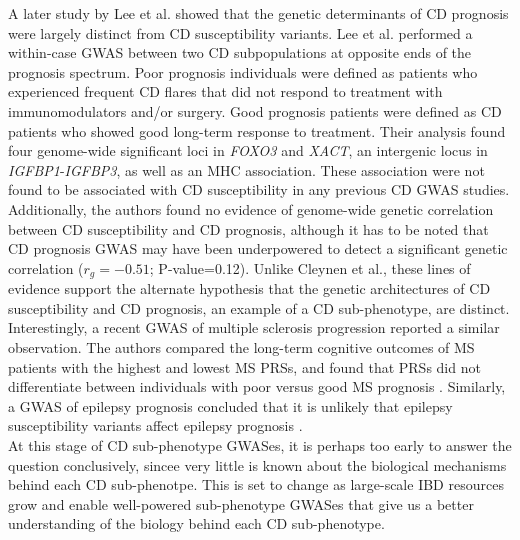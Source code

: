 A later study by Lee et al. \cite{Lee2017-tl} showed that the genetic determinants of CD prognosis were largely distinct from CD susceptibility variants. Lee et al. performed a within-case GWAS between two CD subpopulations at opposite ends of the prognosis spectrum. Poor prognosis individuals were defined as patients who experienced frequent CD flares that did not respond to treatment with immunomodulators and/or surgery. Good prognosis patients were defined as CD patients who showed good long-term response to treatment. Their analysis found four genome-wide significant loci in \textit{FOXO3} and \textit{XACT}, an intergenic locus in \textit{IGFBP1}-\textit{IGFBP3}, as well as an MHC association. These association were not found to be associated with CD susceptibility in any previous CD GWAS studies. Additionally, the authors found no evidence of genome-wide genetic correlation between CD susceptibility and CD prognosis, although it has to be noted that CD prognosis GWAS may have been underpowered to detect a significant genetic correlation ($r_{g}=-0.51$; P-value=0.12). Unlike Cleynen et al., these lines of evidence support the alternate hypothesis that the genetic architectures of CD susceptibility and CD prognosis, an example of a CD sub-phenotype, are distinct. Interestingly, a recent GWAS of multiple sclerosis progression reported a similar observation. The authors compared the long-term cognitive outcomes of MS patients with the highest and lowest MS PRSs, and found that PRSs did not differentiate between individuals with poor versus good MS prognosis \cite{ms_susceptibility}. Similarly, a GWAS of epilepsy prognosis concluded that it is unlikely that epilepsy susceptibility variants affect epilepsy prognosis \cite{Speed2014-lz}.\\

At this stage of CD sub-phenotype GWASes, it is perhaps too early to answer the question conclusively, sincee very little is known about the biological mechanisms behind each CD sub-phenotpe. This is set to change as large-scale IBD resources grow and enable well-powered sub-phenotype GWASes that give us a better understanding of the biology behind each CD sub-phenotype. \\


